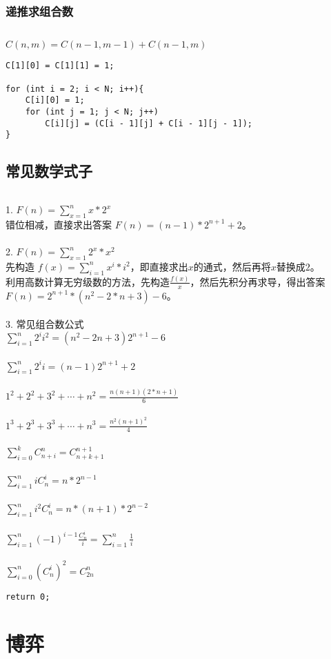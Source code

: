\documentclass[twoside]{article}
\begin{document}
\subsubsection{递推求组合数}
\begin{lstlisting}
\end{lstlisting}
$C(n,m)=C(n-1,m-1)+C(n-1,m)$ \\
\begin{lstlisting}
C[1][0] = C[1][1] = 1;

for (int i = 2; i < N; i++){
	C[i][0] = 1;
	for (int j = 1; j < N; j++)
		C[i][j] = (C[i - 1][j] + C[i - 1][j - 1]);
}\end{lstlisting}
\subsection{常见数学式子}
\begin{lstlisting}
\end{lstlisting}
1. $F(n) = \sum\limits_{x=1}^{n}x*2^x$\\
错位相减，直接求出答案 $F(n)=(n-1)*2^{n+1}+2$。\\
\\
2. $F(n) = \sum\limits_{x=1}^{n}2^x*x^2$\\
先构造 $f(x)=\sum\limits_{i=1}^{n}x^i*i^2$，即直接求出$x$的通式，然后再将$x$替换成$2$。\\
利用高数计算无穷级数的方法，先构造$\frac{f(x)}{x}$，然后先积分再求导，得出答案 $F(n)=2^{n+1}*(n^2-2*n+3)-6$。\\
\\
3. 常见组合数公式\\
$\sum_{i=1}^n{2^ii^2} = (n^2-2n+3)2^{n+1} - 6$\\
\\
$\sum_{i=1}^{n}2^ii = (n-1)2^{n+1} + 2$\\
\\
$1^2+2^2+3^2+\cdots+n^2 = \frac{n(n+1)(2*n+1)}{6}$\\
\\
$1^3+2^3+3^3+\cdots+n^3 = \frac{n^2(n+1)^2}{4}$\\
\\
$\sum_{i=0}^{k}C_{n+i}^{n} = C_{n+k+1}^{n+1}$\\
\\
$\sum_{i=1}^{n}iC_{n}^{i}=n*2^{n-1}$\\
\\
$\sum_{i=1}^{n}i^2C_{n}^{i}=n*(n+1)*2^{n-2}$\\
\\
$\sum_{i=1}^{n}(-1)^{i-1}\frac{C_{n}^{i}}{i}=\sum_{i=1}^{n}\frac{1}{i}$\\
\\
$\sum_{i=0}^{n}(C_{n}^{i})^2=C_{2n}^{n}$\\
\begin{lstlisting}
return 0;\end{lstlisting}
\clearpage\section{博弈}
\end{document}

